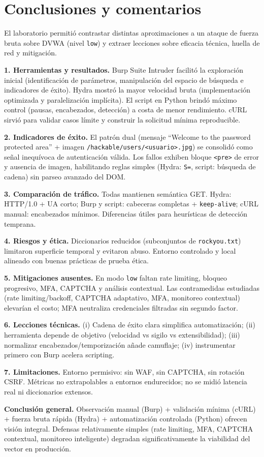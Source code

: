 \documentclass[letterpaper,12pt]{article}
\begin{document}

\section*{Conclusiones y comentarios}
El laboratorio permitió contrastar distintas aproximaciones a un ataque de fuerza bruta sobre DVWA (nivel \texttt{low}) y extraer lecciones sobre eficacia técnica, huella de red y mitigación.

    	\textbf{1. Herramientas y resultados.} Burp Suite Intruder facilitó la exploración inicial (identificación de parámetros, manipulación del espacio de búsqueda e indicadores de éxito). Hydra mostró la mayor velocidad bruta (implementación optimizada y paralelización implícita). El script en Python brindó máximo control (pausas, encabezados, detección) a costa de menor rendimiento. cURL sirvió para validar casos límite y construir la solicitud mínima reproducible.

    	\textbf{2. Indicadores de éxito.} El patrón dual (mensaje “Welcome to the password protected area” + imagen \texttt{/hackable/users/<usuario>.jpg}) se consolidó como señal inequívoca de autenticación válida. Los fallos exhiben bloque \texttt{<pre>} de error y ausencia de imagen, habilitando reglas simples (Hydra: \texttt{S=}, script: búsqueda de cadena) sin parseo avanzado del DOM.

    	\textbf{3. Comparación de tráfico.} Todas mantienen semántica GET. Hydra: HTTP/1.0 + UA corto; Burp y script: cabeceras completas + \texttt{keep-alive}; cURL manual: encabezados mínimos. Diferencias útiles para heurísticas de detección temprana.

    	\textbf{4. Riesgos y ética.} Diccionarios reducidos (subconjuntos de \texttt{rockyou.txt}) limitaron superficie temporal y evitaron abuso. Entorno controlado y local alineado con buenas prácticas de prueba ética.

    	\textbf{5. Mitigaciones ausentes.} En modo \texttt{low} faltan rate limiting, bloqueo progresivo, MFA, CAPTCHA y análisis contextual. Las contramedidas estudiadas (rate limiting/backoff, CAPTCHA adaptativo, MFA, monitoreo contextual) elevarían el costo; MFA neutraliza credenciales filtradas sin segundo factor.

    	\textbf{6. Lecciones técnicas.} (i) Cadena de éxito clara simplifica automatización; (ii) herramienta depende de objetivo (velocidad vs sigilo vs extensibilidad); (iii) normalizar encabezados/temporización añade camuflaje; (iv) instrumentar primero con Burp acelera scripting.

    	\textbf{7. Limitaciones.} Entorno permisivo: sin WAF, sin CAPTCHA, sin rotación CSRF. Métricas no extrapolables a entornos endurecidos; no se midió latencia real ni diccionarios extensos.

    	\textbf{Conclusión general.} Observación manual (Burp) + validación mínima (cURL) + fuerza bruta rápida (Hydra) + automatización controlada (Python) ofrecen visión integral. Defensas relativamente simples (rate limiting, MFA, CAPTCHA contextual, monitoreo inteligente) degradan significativamente la viabilidad del vector en producción.
\end{document}
